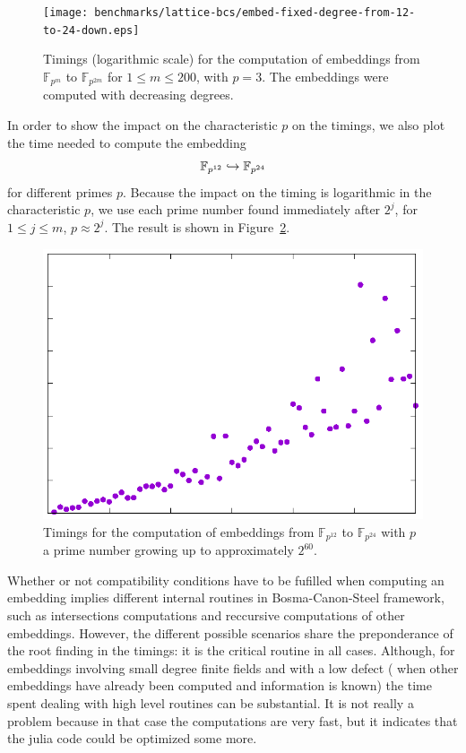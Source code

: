 \begin{figure}
  \centering
  \texttt{[image: benchmarks/lattice-bcs/embed-fixed-degree-from-12-to-24-down.eps]}
  \caption{Timings (logarithmic scale) for the computation of embeddings from $\mathbb{F}_{p^{m}}$
  to $\mathbb{F}_{p^{2m}}$ for $1\leq m\leq 200$, with $p=3$. The
  embeddings were computed with decreasing degrees.}
  \label{fig:bcs-embed-fixed-degree-down}
\end{figure}
In order to show the impact on the characteristic $p$ on the timings, we also
plot the time needed to compute the embedding
\[
  \mathbb{F}_{p^{12}}\hookrightarrow\mathbb{F}_{p^{24}}
\]
for different primes $p$. Because the impact on the timing is logarithmic in the
characteristic $p$, we use each prime number found immediately after $2^j$,
for $1\leq j\leq m$, \ie $p\approx 2^j$. The result is shown in
Figure~\ref{fig:bcs-embed-primes}.
\begin{figure}
  \centering
  \includegraphics{benchmarks/lattice-bcs/embed-primes-exp.eps}
  \caption{Timings for the computation of embeddings from $\mathbb{F}_{p^{12}}$
  to $\mathbb{F}_{p^{24}}$ with $p$ a prime number growing up to approximately
  $2^{60}$.}
  \label{fig:bcs-embed-primes}
\end{figure}
Whether or not compatibility conditions have to be fufilled when computing an
embedding implies different internal routines in Bosma-Canon-Steel framework,
such as intersections computations and reccursive computations of other
embeddings. However, the different possible scenarios share the preponderance of the
root finding in the timings: it is the critical routine in all cases. Although,
for embeddings involving small degree finite fields and with a low defect (\ie
when other embeddings have already been computed and information is known) the
time spent dealing with high level routines can be substantial. It is not
really a problem because in that case the computations are very fast, but it
indicates that the julia code could be optimized some more.

%
